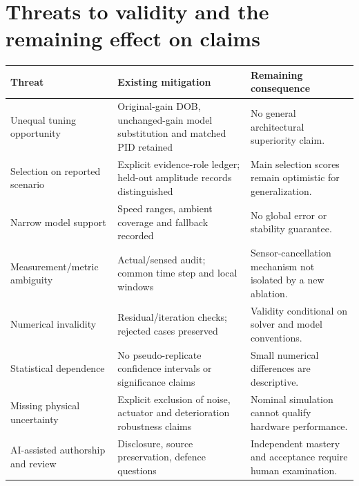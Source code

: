 \section{Threats to validity and the remaining effect on claims}
\begin{longtable}{@{}p{.23\linewidth}p{.34\linewidth}p{.35\linewidth}@{}}
\toprule Threat & Existing mitigation & Remaining consequence\\\midrule\endhead
Unequal tuning opportunity & Original-gain DOB, unchanged-gain model substitution and matched PID retained & No general architectural superiority claim.\\
Selection on reported scenario & Explicit evidence-role ledger; held-out amplitude records distinguished & Main selection scores remain optimistic for generalization.\\
Narrow model support & Speed ranges, ambient coverage and fallback recorded & No global error or stability guarantee.\\
Measurement/metric ambiguity & Actual/sensed audit; common time step and local windows & Sensor-cancellation mechanism not isolated by a new ablation.\\
Numerical invalidity & Residual/iteration checks; rejected cases preserved & Validity conditional on solver and model conventions.\\
Statistical dependence & No pseudo-replicate confidence intervals or significance claims & Small numerical differences are descriptive.\\
Missing physical uncertainty & Explicit exclusion of noise, actuator and deterioration robustness claims & Nominal simulation cannot qualify hardware performance.\\
AI-assisted authorship and review & Disclosure, source preservation, defence questions & Independent mastery and acceptance require human examination.\\\bottomrule
\end{longtable}


